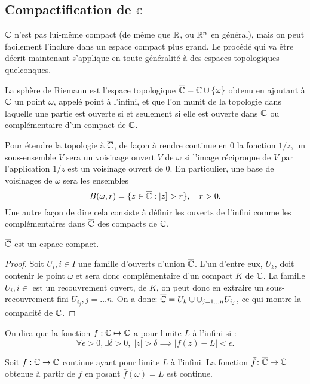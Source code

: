\subsection{Compactification de $\mathbb{C}$} \label{CompacC}
$\mathbb{C}$ n'est pas lui-même compact (de même que $\mathbb R$, ou $\mathbb R^n$ en général), mais on peut facilement l'inclure dans un espace compact plus grand. Le procédé qui va être décrit maintenant s'applique en toute généralité à des espaces topologiques quelconques.
\begin{fdefn}
La sphère de Riemann est l'espace topologique  $\overline{\mathbb{C}} = \mathbb{C} \cup \{ \omega\}$ obtenu en ajoutant à $\mathbb{C}$ un point $\omega$, appelé point à l'infini, et que l'on munit de la topologie dans laquelle une partie est ouverte si et seulement si elle est ouverte dans $\mathbb{C}$ ou complémentaire d'un compact de $\mathbb{C}$.
\end{fdefn}
Pour étendre la topologie à $\overline{\mathbb{C}}$, de façon à rendre continue en $0$ la fonction $1/z$, un sous-ensemble $V$ sera un voisinage ouvert $V$ de $\omega$ si l'image réciproque de $V$ par l'application $1/z$ est un voisinage ouvert de $0$. En particulier, une base de voisinages de $\omega$ sera les ensembles
\[ B(\omega, r)=\{z  \in \overline{\mathbb{C}} : |z]>r\}, \quad r>0.\]
Une autre façon de dire cela consiste à définir les ouverts de l'infini comme les complémentaires dans $\overline{\mathbb{C}}$ des compacts de $\mathbb{C}$.
\begin{fprop}
$\overline{\mathbb{C}}$ est un espace compact.
\end{fprop}
\begin{proof}
Soit $U_i, i \in I$ une famille d'ouverts d'union $\overline{\mathbb{C}}$. L'un d'entre eux, $U_k$, doit contenir le point $\omega$ et sera donc complémentaire d'un compact $K$ de $\mathbb{C}$. La famille $U_i, i \in $ est un recouvrement ouvert, de $K$, on peut donc en extraire un sous-recouvrement fini $U_{i_j}, j=\dots n$. On a donc: $\overline{\mathbb{C}} = U_k \cup \cup_{j=1\dots n} U_{i_j}$, ce qui montre la compacité de $\mathbb{C}$.
\end{proof}
\begin{fdefn}
On dira que la fonction $f : \mathbb{C} \mapsto \mathbb{C}$ a pour limite $L$ à l'infini si : 
\[\forall \epsilon >0, \exists \delta >0, \;  \lvert z \rvert > \delta \implies \lvert f(z)-L \rvert < \epsilon.\]
\end{fdefn}
\begin{fprop}
Soit $f : \mathbb{C} \to \mathbb{C}$ continue ayant pour limite $L$ à l'infini. La fonction $\bar{f} \colon \overline{\mathbb{C}} \to \mathbb{C}$ obtenue à partir de $f$ en posant $\bar{f}(\omega)=L$ est continue.
\end{fprop}
